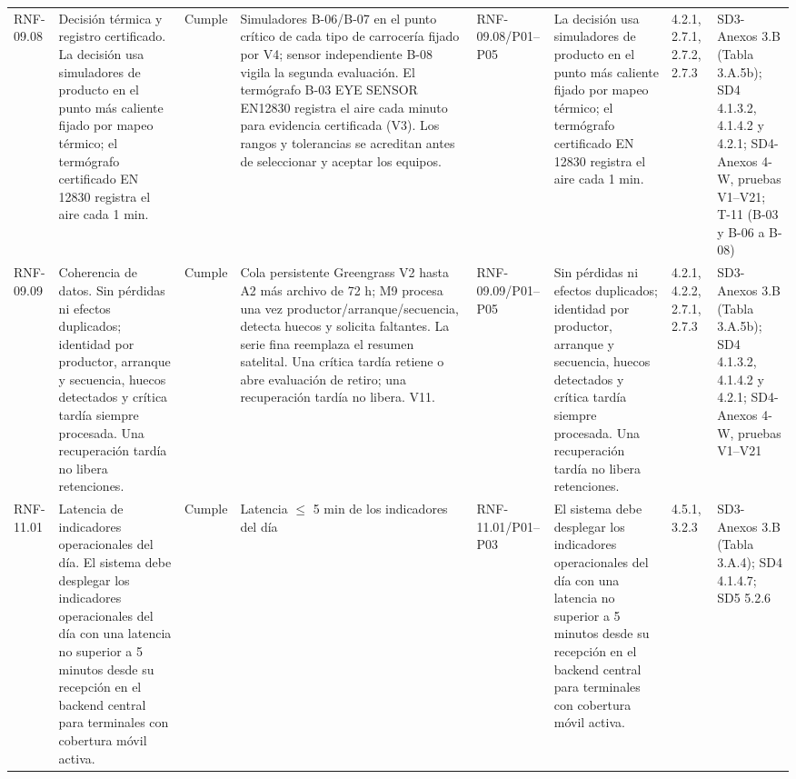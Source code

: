 \documentclass[oficio,firma,final]{lafrox}
\begin{document}
\begin{landscape}
{\begin{longtable}{@{}F{0.054} F{0.173} F{0.061} F{0.191} F{0.106} F{0.180} F{0.067} F{0.168}@{}}
  RNF-09.08 & Decisión térmica y registro certificado. La decisión usa simuladores de producto en el punto más caliente fijado por mapeo térmico; el termógrafo certificado EN 12830 registra el aire cada 1 min. & Cumple & Simuladores B-06/B-07 en el punto crítico de cada tipo de carrocería fijado por V4; sensor independiente B-08 vigila la segunda evaluación. El termógrafo B-03 EYE SENSOR EN12830 registra el aire cada minuto para evidencia certificada (V3). Los rangos y tolerancias se acreditan antes de seleccionar y aceptar los equipos. & RNF-09.08/\allowbreak{}P01--\allowbreak{}P05 & La decisión usa simuladores de producto en el punto más caliente fijado por mapeo térmico; el termógrafo certificado EN 12830 registra el aire cada 1 min. & 4.2.1, 2.7.1, 2.7.2, 2.7.3 & SD3-Anexos 3.B (Tabla 3.A.5b); SD4 4.1.3.2, 4.1.4.2 y 4.2.1; SD4-Anexos 4-W, pruebas V1–V21; T-11 (B-03 y B-06 a B-08)  \\
  RNF-09.09 & Coherencia de datos. Sin pérdidas ni efectos duplicados; identidad por productor, arranque y secuencia, huecos detectados y crítica tardía siempre procesada. Una recuperación tardía no libera retenciones. & Cumple & Cola persistente Greengrass V2 hasta A2 más archivo de 72 h; M9 procesa una vez productor/arranque/secuencia, detecta huecos y solicita faltantes. La serie fina reemplaza el resumen satelital. Una crítica tardía retiene o abre evaluación de retiro; una recuperación tardía no libera. V11. & RNF-09.09/\allowbreak{}P01--\allowbreak{}P05 & Sin pérdidas ni efectos duplicados; identidad por productor, arranque y secuencia, huecos detectados y crítica tardía siempre procesada. Una recuperación tardía no libera retenciones. & 4.2.1, 4.2.2, 2.7.1, 2.7.3 & SD3-Anexos 3.B (Tabla 3.A.5b); SD4 4.1.3.2, 4.1.4.2 y 4.2.1; SD4-Anexos 4-W, pruebas V1–V21  \\
  RNF-11.01 & Latencia de indicadores operacionales del día. El sistema debe desplegar los indicadores operacionales del día con una latencia no superior a 5 minutos desde su recepción en el backend central para terminales con cobertura móvil activa. & Cumple & Latencia $\leq$ 5 min de los indicadores del día & RNF-11.01/\allowbreak{}P01--\allowbreak{}P03 & El sistema debe desplegar los indicadores operacionales del día con una latencia no superior a 5 minutos desde su recepción en el backend central para terminales con cobertura móvil activa. & 4.5.1, 3.2.3 & SD3-Anexos 3.B (Tabla 3.A.4); SD4 4.1.4.7; SD5 5.2.6  \\

\end{longtable}}
\end{landscape}
\end{document}

